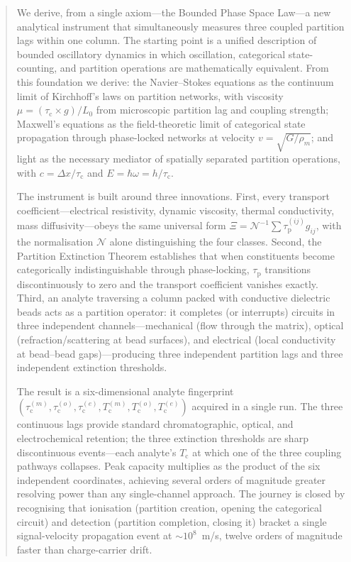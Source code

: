 \documentclass[twocolumn,10pt,a4paper]{article}
\theoremstyle{definition}
\theoremstyle{remark}
\newcommand{\Tcrit}{T_{\mathrm{c}}}
\newcommand{\tauP}{\tau_{\mathrm{p}}}
\newcommand{\tauC}{\tau_{\mathrm{c}}}
\newcommand{\tauM}{\tau_{\mathrm{c}}^{(m)}}
\newcommand{\tauO}{\tau_{\mathrm{c}}^{(o)}}
\newcommand{\tauE}{\tau_{\mathrm{c}}^{(e)}}
\newcommand{\TcM}{T_{\mathrm{c}}^{(m)}}
\newcommand{\TcO}{T_{\mathrm{c}}^{(o)}}
\newcommand{\TcE}{T_{\mathrm{c}}^{(e)}}
\newcommand{\Norm}{\mathcal{N}}
\newcommand{\Transp}{\Xi}
\begin{document}
\begin{abstract}
\noindent We derive, from a single axiom---the Bounded Phase Space Law---a new analytical instrument that simultaneously measures three coupled partition lags within one column. The starting point is a unified description of bounded oscillatory dynamics in which oscillation, categorical state-counting, and partition operations are mathematically equivalent. From this foundation we derive: the Navier--Stokes equations as the continuum limit of Kirchhoff's laws on partition networks, with viscosity $\mu = (\tauC \times g)/L_0$ from microscopic partition lag and coupling strength; Maxwell's equations as the field-theoretic limit of categorical state propagation through phase-locked networks at velocity $v = \sqrt{G/\rho_m}$; and light as the necessary mediator of spatially separated partition operations, with $c = \Delta x/\tauC$ and $E = \hbar\omega = h/\tauC$.

\vspace{0.2cm}
\noindent The instrument is built around three innovations. First, every transport coefficient---electrical resistivity, dynamic viscosity, thermal conductivity, mass diffusivity---obeys the same universal form $\Transp = \Norm^{-1}\sum \tauP^{(ij)} g_{ij}$, with the normalisation $\Norm$ alone distinguishing the four classes. Second, the Partition Extinction Theorem establishes that when constituents become categorically indistinguishable through phase-locking, $\tauP$ transitions discontinuously to zero and the transport coefficient vanishes exactly. Third, an analyte traversing a column packed with conductive dielectric beads acts as a partition operator: it completes (or interrupts) circuits in three independent channels---mechanical (flow through the matrix), optical (refraction/scattering at bead surfaces), and electrical (local conductivity at bead--bead gaps)---producing three independent partition lags and three independent extinction thresholds.

\vspace{0.2cm}
\noindent The result is a six-dimensional analyte fingerprint $(\tauM, \tauO, \tauE, \TcM, \TcO, \TcE)$ acquired in a single run. The three continuous lags provide standard chromatographic, optical, and electrochemical retention; the three extinction thresholds are sharp discontinuous events---each analyte's $\Tcrit$ at which one of the three coupling pathways collapses. Peak capacity multiplies as the product of the six independent coordinates, achieving several orders of magnitude greater resolving power than any single-channel approach. The journey is closed by recognising that ionisation (partition creation, opening the categorical circuit) and detection (partition completion, closing it) bracket a single signal-velocity propagation event at $\sim 10^8$~m/s, twelve orders of magnitude faster than charge-carrier drift.


\end{abstract}
\end{document}
